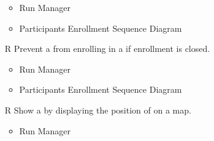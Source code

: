 \begin{itemize}
	\begin{itemize}
		\item Run Manager
		\item Participants Enrollment Sequence Diagram
	\end{itemize}
	\item[R\subs{47}]Prevent a  from enrolling in a  if enrollment is closed.
	\begin{itemize}
		\item Run Manager
		\item Participants Enrollment Sequence Diagram
	\end{itemize}
	\item[R\subs{48}]Show a  by displaying the position of  on a map.
	\begin{itemize}
		\item Run Manager
	\end{itemize}
\end{itemize}


\thispagestyle{fancy}

